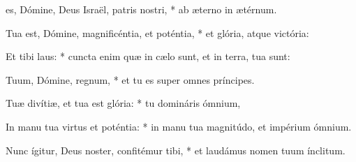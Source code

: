 \begin{psalmus}

 es, Dómine, Deus Israël, patris nostri, * ab æterno in ætérnum.

Tua est, Dómine, magnificéntia, et poténtia, * et glória, atque victória:

Et tibi laus: * cuncta enim quæ in cælo sunt, et in terra, tua sunt:

Tuum, Dómine, regnum, * et tu es super omnes príncipes.

Tuæ divítiæ, et tua est glória: * tu domináris ómnium,

In manu tua virtus et poténtia: * in manu tua magnitúdo, et impérium ómnium.

Nunc ígitur, Deus noster, confitémur tibi, * et laudámus nomen tuum ínclitum.

\end{psalmus}
